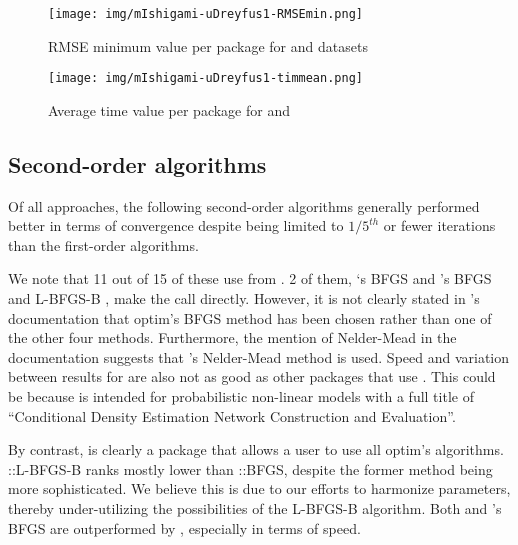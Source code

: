 \begin{Schunk}
\end{Schunk}

\begin{figure}
  \centering
  \texttt{[image: img/mIshigami-uDreyfus1-RMSEmin.png]}
        \label{fig:Allpkg:RMSEmin}
        \caption{RMSE minimum value per package for 
        and  datasets}
\end{figure}

\begin{figure}
  \centering
  \texttt{[image: img/mIshigami-uDreyfus1-timmean.png]}
        \label{fig:Allpkg:timemean}
        \caption{Average time value per package for 
        and }
\end{figure}

\hypertarget{second-order-algorithms}{%
\subsection{Second-order algorithms}\label{second-order-algorithms}}

Of all approaches, the following second-order algorithms generally
performed better in terms of convergence despite being limited to
\(1/5^{th}\) or fewer iterations than the first-order algorithms.

We note that 11 out of 15 of these  use
 from . 2 of them, `s BFGS
\citep{R-CaDENCE} and 's BFGS and L-BFGS-B
\citep{R-validann}, make the call directly. However, it is not clearly
stated in 's documentation that optim's BFGS method has
been chosen rather than one of the other four methods. Furthermore, the
mention of Nelder-Mead in the documentation suggests that 's
Nelder-Mead method is used. Speed and variation between results for
 are also not as good as other packages that use
. This could be because  is intended for
probabilistic non-linear models with a full title of ``Conditional
Density Estimation Network Construction and Evaluation''.

By contrast,  is clearly a package that allows a user
to use all optim's algorithms. ::L-BFGS-B ranks mostly
lower than ::BFGS, despite the former method being
more sophisticated. We believe this is due to our efforts to harmonize
parameters, thereby under-utilizing the possibilities of the L-BFGS-B
algorithm. Both  and 's BFGS are
outperformed by , especially in terms of speed.

